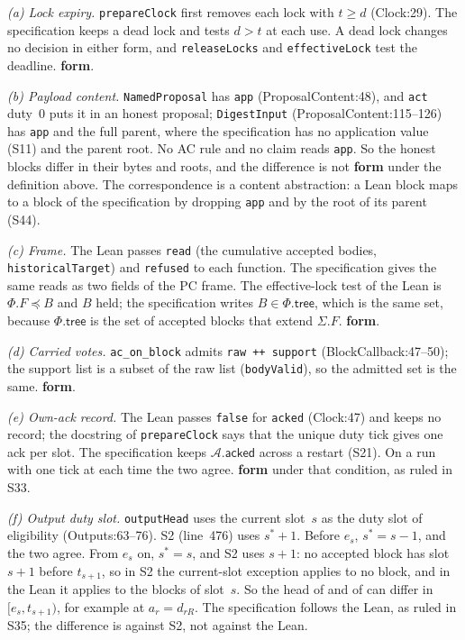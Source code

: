 \documentclass{article}
\newcommand{\AC}{\mathcal A}
\newcommand{\Fr}{\Phi}
\newcommand{\tree}{\mathsf{tree}}
\newcommand{\fname}[1]{\text{\textsc{#1}}}
\newcommand{\acked}{\mathsf{acked}}
\newcommand{\nm}[1]{\nolinkurl{#1}}
\newcommand{\Fm}{\textbf{form}}
\begin{document}
\emph{(a) Lock expiry.}  \nm{prepareClock} first removes each lock with
$t\geq d$ (Clock:29).  The specification keeps a dead lock and tests
$d>t$ at each use.  A dead lock changes no decision in either form, and
\nm{releaseLocks} and \nm{effectiveLock} test the deadline.  \Fm.

\emph{(b) Payload content.}  \nm{NamedProposal} has \nm{app}
(ProposalContent:48), and \nm{act} duty~0 puts it in an honest proposal;
\nm{DigestInput} (ProposalContent:115--126) has \nm{app} and the full
parent, where the specification has no application value (S11) and the
parent root.  No AC rule and no claim reads \nm{app}.  So the honest
blocks differ in their bytes and roots, and the difference is not \Fm{}
under the definition above.  The correspondence is a content abstraction:
a Lean block maps to a block of the specification by dropping \nm{app}
and by the root of its parent (S44).

\emph{(c) Frame.}  The Lean passes \nm{read} (the cumulative accepted
bodies, \nm{historicalTarget}) and \nm{refused} to each function.  The
specification gives the same reads as two fields of the PC frame.  The
effective-lock test of the Lean is $\Fr.F\preceq B$ and $B$ held; the
specification writes $B\in\Fr.\tree$, which is the same set, because
$\Fr.\tree$ is the set of accepted blocks that extend $\Sigma.F$.  \Fm.

\emph{(d) Carried votes.}  \nm{ac\_on\_block} admits \nm{raw ++ support}
(BlockCallback:47--50); the support list is a subset of the raw list
(\nm{bodyValid}), so the admitted set is the same.  \Fm.

\emph{(e) Own-ack record.}  The Lean passes \nm{false} for \nm{acked}
(Clock:47) and keeps no record; the docstring of \nm{prepareClock} says
that the unique duty tick gives one ack per slot.  The specification keeps
$\AC.\acked$ across a restart (S21).  On a run with one tick at each time
the two agree.  \Fm{} under that condition, as ruled in S33.

\emph{(f) Output duty slot.}  \nm{outputHead} uses the current slot~$s$
as the duty slot of eligibility (Outputs:63--76).  S2 (line~476) uses
$s^*+1$.  Before $e_s$, $s^*=s-1$, and the two agree.  From $e_s$ on,
$s^*=s$, and S2 uses $s+1$: no accepted block has slot $s+1$ before
$t_{s+1}$, so in S2 the current-slot exception applies to no block, and
in the Lean it applies to the blocks of slot~$s$.  So the head of
\fname{ac\_head} and of \fname{ac\_to\_fg} can differ in
$[e_s,t_{s+1})$, for example at $a_r=d_{rR}$.  The specification follows
the Lean, as ruled in S35; the difference is against S2, not against the
Lean.
\end{document}
